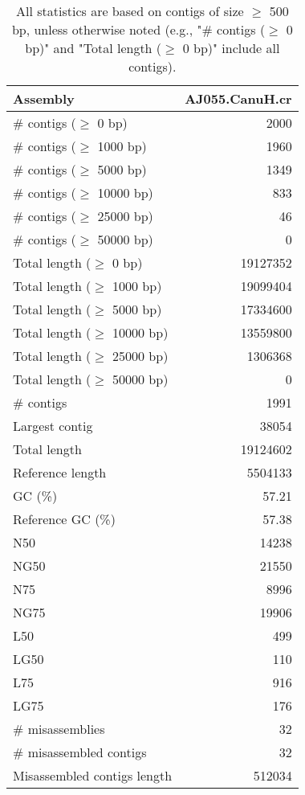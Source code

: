 \documentclass[12pt,a4paper]{article}
\begin{document}
\begin{table}[ht]
\begin{center}
\caption{All statistics are based on contigs of size $\geq$ 500 bp, unless otherwise noted (e.g., "\# contigs ($\geq$ 0 bp)" and "Total length ($\geq$ 0 bp)" include all contigs).}
\begin{tabular}{|l*{1}{|r}|}
\hline
Assembly & AJ055.CanuH.cr \\ \hline
\# contigs ($\geq$ 0 bp) & 2000 \\ \hline
\# contigs ($\geq$ 1000 bp) & 1960 \\ \hline
\# contigs ($\geq$ 5000 bp) & 1349 \\ \hline
\# contigs ($\geq$ 10000 bp) & 833 \\ \hline
\# contigs ($\geq$ 25000 bp) & 46 \\ \hline
\# contigs ($\geq$ 50000 bp) & 0 \\ \hline
Total length ($\geq$ 0 bp) & 19127352 \\ \hline
Total length ($\geq$ 1000 bp) & 19099404 \\ \hline
Total length ($\geq$ 5000 bp) & 17334600 \\ \hline
Total length ($\geq$ 10000 bp) & 13559800 \\ \hline
Total length ($\geq$ 25000 bp) & 1306368 \\ \hline
Total length ($\geq$ 50000 bp) & 0 \\ \hline
\# contigs & 1991 \\ \hline
Largest contig & 38054 \\ \hline
Total length & 19124602 \\ \hline
Reference length & 5504133 \\ \hline
GC (\%) & 57.21 \\ \hline
Reference GC (\%) & 57.38 \\ \hline
N50 & 14238 \\ \hline
NG50 & 21550 \\ \hline
N75 & 8996 \\ \hline
NG75 & 19906 \\ \hline
L50 & 499 \\ \hline
LG50 & 110 \\ \hline
L75 & 916 \\ \hline
LG75 & 176 \\ \hline
\# misassemblies & 32 \\ \hline
\# misassembled contigs & 32 \\ \hline
Misassembled contigs length & 512034 \\ \hline

\end{tabular}
\end{center}
\end{table}
\end{document}

